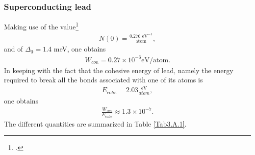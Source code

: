 \subsubsection{Superconducting lead}
Making use of the value\footnote{\cite{Beck:70}.}
\begin{align}\label{eqC3AppA5}
N(0)=\frac{0.276\text{ eV}^{-1}}{\text{atom}},
\end{align}
and of $\Delta_0=1.4$ meV, one obtains
\begin{align}\label{eqC3AppA6}
W_{con}=0.27\times10^{-6}\text{eV/atom}.
\end{align}
In keeping with the fact that the cohesive energy of lead, namely the energy required to break all the bonds associated with one of its atoms is
\begin{align}\label{eqC3AppA7}
E_{cohe}=2.03\frac{\text{eV}}{{atom}},
\end{align}
one obtains
\begin{align}\label{eqC3AppA8}
\frac{W_{con}}{E_{cohe}}\approx1.3\times10^{-7}.
\end{align}
The different quantities are summarized in Table \ref{Tab3.A.1}.
